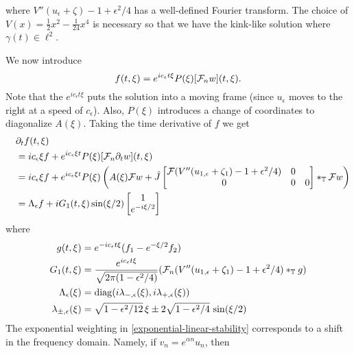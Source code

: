 where \(V''(u_\epsilon + \zeta) - 1 + \epsilon^2/4\) has a well-defined Fourier transform. The choice of \(V(x) = \frac 1 2 x^2 - \frac 1 {24} x^4\) is necessary so that we have the kink-like solution where \(\gamma(t) \in \ell^2\).

We now introduce
\begin{equation*} 
	f(t,\xi)  = e^{ic_\epsilon t \xi} P(\xi) [\mathcal{F}_n w](t,\xi).
\end{equation*} 
Note that the \(e^{ic_\epsilon t\xi}\) puts the solution into a moving frame (since \(u_\epsilon\) moves to the right at a speed of \(c_\epsilon\)). Also, \(P(\xi)\) introduces a change of coordinates to diagonalize \(A(\xi)\). Taking the time derivative of \(f\) we get
\begin{equation}\label{f-eqn}
\begin{aligned}
	&\partial_t f(t,\xi) \\
	\quad &= i c_\epsilon \xi f + e^{i c_\epsilon \xi t} P(\xi) [\mathcal{F}_n \partial_t w](t,\xi) \\
	\quad &= i c_\epsilon \xi f + e^{i c_\epsilon \xi t} P(\xi) \left( A(\xi) \mathcal F w + \hat J\begin{bmatrix}
		\mathcal F(V''(u_{1,\epsilon} +\zeta_1) - 1 + \epsilon^2/4) & 0 \\ 0 & 0 & 0 
	\end{bmatrix} *_{\mathbb T} \mathcal F w \right) \\
	\quad &= \Lambda_\epsilon f + i G_1(t,\xi) \sin(\xi/2)\begin{bmatrix}
		1 \\ e^{-i\xi/2}
	\end{bmatrix}
\end{aligned}
\end{equation}
where 
\begin{equation}\label{notation-f-eqn}
\begin{aligned}
	g(t,\xi) &= e^{-ic_\epsilon t \xi}(f_1 - e^{-\xi/2} f_2) \\
	G_1(t,\xi) &= \frac{e^{ic_\epsilon t \xi}}{\sqrt{2\pi (1 - \epsilon^2/ 4) }} (\mathcal{F}_n(V''(u_{1,\epsilon}  + \zeta_1) -1 + \epsilon^2/4) *_{\mathbb T} g ) \\
	\Lambda_\epsilon(\xi) &= \mathrm{diag}(i \lambda_{-,\epsilon} (\xi), i \lambda_{+,\epsilon}(\xi)) \\
	\lambda_{\pm, \epsilon}(\xi) &= \sqrt{1-\epsilon^2/12}\, \xi \pm 2 \sqrt{1-\epsilon^2/4} \, \sin(\xi/2)
\end{aligned}
\end{equation}
The exponential weighting in \cref{exponential-linear-stability} corresponds to a shift in the frequency domain. Namely, if \(v_n = e^{\alpha n} u_n\), then 
